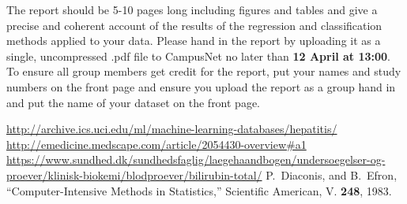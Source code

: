 \documentclass[10pt, paper=a4]{article}
\begin{document}
The report should be 5-10 pages long including figures and tables and
give a precise and coherent account of the results of the regression
and classification methods applied to your data. Please hand in the
report by uploading it as a single, uncompressed .pdf file to
CampusNet no later than {\bf 12 April at 13:00}.  To ensure all group
members get credit for the report, put your names and study numbers on
the front page and ensure you upload the report as a group hand in and
put the name of your dataset on the front page.
\begin{thebibliography}{99}
  \url{http://archive.ics.uci.edu/ml/machine-learning-databases/hepatitis/}
  \url{http://emedicine.medscape.com/article/2054430-overview#a1}
  \url{https://www.sundhed.dk/sundhedsfaglig/laegehaandbogen/undersoegelser-og-proever/klinisk-biokemi/blodproever/bilirubin-total/}
 P.~Diaconis, and B.~Efron,
  ``Computer-Intensive Methods in Statistics,'' Scientific American,
  V. {\bf 248}, 1983.
\end{thebibliography}
\end{document}
